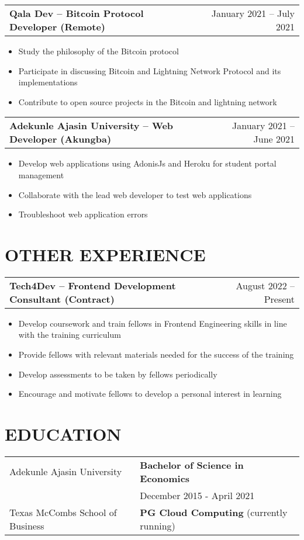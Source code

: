 \documentclass[a4paper,12pt]{article}
\makeatletter
\newenvironment{joblong}[2]
    {
    \begin{tabularx}{\linewidth}{@{}l X r@{}}
    \textbf{#1} & \hfill &  #2 \\[3.75pt]
    \end{tabularx}
    \begin{minipage}[t]{\linewidth}
    \begin{itemize}[nosep,after=\strut, leftmargin=1em, itemsep=3pt,label=--]
    }
    {
    \end{itemize}
    \end{minipage}    
    }
\makeatother
\begin{document}
\begin{joblong}{Qala Dev -- Bitcoin Protocol Developer (Remote)}{January 2021 -- July 2021}
\item Study the philosophy of the Bitcoin protocol
\item Participate in discussing Bitcoin and Lightning Network Protocol and its implementations
\item Contribute to open source projects in the Bitcoin and lightning network
\end{joblong}

\begin{joblong}{Adekunle Ajasin University -- Web Developer (Akungba)}{January 2021 -- June 2021}
\item Develop web applications using AdonisJs and Heroku for student portal management
\item Collaborate with the lead web developer to test web applications
\item Troubleshoot web application errors
\end{joblong}

\section{OTHER EXPERIENCE}

\begin{joblong}{Tech4Dev -- Frontend Development Consultant (Contract)}{August 2022 -- Present}
\item Develop coursework and train fellows in Frontend Engineering skills in line with the training curriculum
\item Provide fellows with relevant materials needed for the success of the training
\item Develop assessments to be taken by fellows periodically
\item Encourage and motivate fellows to develop a personal interest in learning
\end{joblong}

\section{EDUCATION}

\begin{tabularx}{\linewidth}{@{}l X@{}}
Adekunle Ajasin University & \textbf{Bachelor of Science in Economics} \\
                          & December 2015 - April 2021 \\[10pt]
Texas McCombs School of Business & \textbf{PG Cloud Computing} (currently running)
\end{tabularx}
\end{document}

